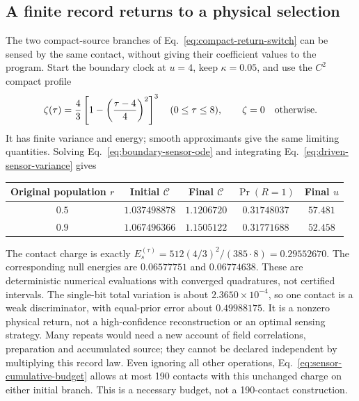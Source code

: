 \documentclass[12pt,a4paper]{article}
\begin{document}
\subsection{A finite record returns to a physical selection}
\label{sec:sensor-selection-return}

The two compact-source branches of Eq.~\eqref{eq:compact-return-switch} can
be sensed by the same contact, without giving their coefficient values to the
program. Start the boundary clock at $u=4$, keep $\kappa=0.05$, and use the
$C^2$ compact profile
\begin{equation}\label{eq:finite-sensor-profile}
 \zeta(\tau)=\frac43\left[1-\left(\frac{\tau-4}{4}\right)^2\right]^3
 \quad (0\le\tau\le8),\qquad \zeta=0\quad\hbox{otherwise}.
\end{equation}
It has finite variance and energy; smooth approximants give the same limiting
quantities. Solving Eq.~\eqref{eq:boundary-sensor-ode} and integrating
Eq.~\eqref{eq:driven-sensor-variance} gives
\begin{center}
\begin{tabular}{@{}ccccc@{}}
\toprule
Original population $r$ & Initial $\mathcal C$ & Final $\mathcal C$
 & $\Pr(R=1)$ & Final $u$\\
\midrule
$0.5$ & $1.037498878$ & $1.1206720$ & $0.31748037$ & $57.481$\\
$0.9$ & $1.067496366$ & $1.1505122$ & $0.31771688$ & $52.458$\\
\bottomrule
\end{tabular}
\end{center}
The contact charge is exactly
$E_s^{(\tau)}=512(4/3)^2/(385\cdot8)=0.29552670$.
The corresponding null energies are $0.06577751$ and $0.06774638$.
These are deterministic numerical evaluations with converged quadratures,
not certified intervals. The single-bit total variation is about
$2.3650\times10^{-4}$, so one contact is a weak discriminator, with
equal-prior error about $0.49988175$. It is a nonzero physical return, not a
high-confidence reconstruction or an optimal sensing strategy. Many repeats
would need a new account of field correlations, preparation and accumulated
source; they cannot be declared independent by multiplying this record law.
Even ignoring all other operations, Eq.~\eqref{eq:sensor-cumulative-budget}
allows at most 190 contacts with this unchanged charge on either initial
branch. This is a necessary budget, not a 190-contact construction.
\end{document}

